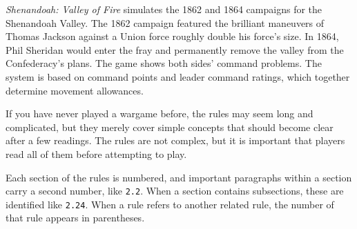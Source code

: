 
\textit{Shenandoah: Valley of Fire} simulates the 1862 and 1864 campaigns for the Shenandoah Valley. The 1862 campaign featured the brilliant maneuvers of Thomas Jackson against a Union force roughly double his force's size. In 1864, Phil Sheridan would enter the fray and permanently remove the valley from the Confederacy's plans. The game shows both sides' command problems. The system is based on command points and leader command ratings, which together determine movement allowances.

If you have never played a wargame before, the rules may seem long and complicated, but they merely cover simple concepts that should become clear after a few readings. The rules are not complex, but it is important that players read all of them before attempting to play.

Each section of the rules is numbered, and important paragraphs within a section carry a second number, like \texttt{2.2}. When a section contains subsections, these are identified like \texttt{2.24}. When a rule refers to another related rule, the number of that rule appears in parentheses.
